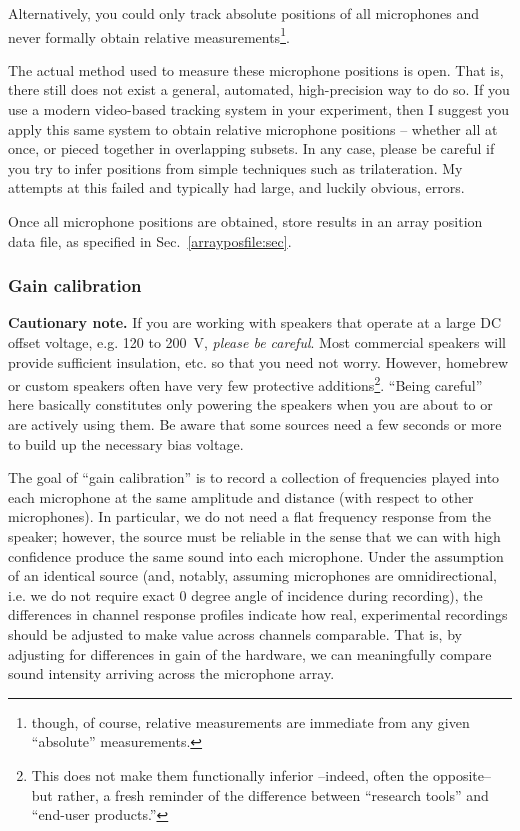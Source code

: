 \documentclass[letterpaper]{article}
\begin{document}
Alternatively, you could only track absolute positions of all
microphones and never formally obtain relative
measurements\footnote{though, of course, relative measurements are
  immediate from any given ``absolute'' measurements.}.

The actual method used to measure these microphone positions is
open. That is, there still does not exist a general, automated,
high-precision way to do so. If you use a modern video-based tracking
system in your experiment, then I suggest you apply this same system
to obtain relative microphone positions -- whether all at once, or
pieced together in overlapping subsets. In any case, please be careful
if you try to infer positions from simple techniques such as
trilateration. My attempts at this failed and typically had large, and
luckily obvious, errors.

Once all microphone positions are obtained, store results in an array
position data file, as specified in Sec.~\ref{arrayposfile:sec}.


\subsubsection{Gain calibration}

\textbf{Cautionary note.} If you are working with speakers that
operate at a large DC offset voltage, e.g. 120 to 200~V,
\textit{please be careful}. Most commercial speakers will provide
sufficient insulation, etc. so that you need not worry. However,
homebrew or custom speakers often have very few protective
additions\footnote{This does not make them functionally inferior
  --indeed, often the opposite-- but rather, a fresh reminder of the
  difference between ``research tools'' and ``end-user
  products.''}. ``Being careful'' here basically constitutes only
powering the speakers when you are about to or are actively using
them. Be aware that some sources need a few seconds or more to build up
the necessary bias voltage.

The goal of ``gain calibration'' is to record a collection of
frequencies played into each microphone at the same amplitude and
distance (with respect to other microphones). In particular, we do not
need a flat frequency response from the speaker; however, the source
must be reliable in the sense that we can with high confidence produce
the same sound into each microphone. Under the assumption of an
identical source (and, notably, assuming microphones are
omnidirectional, i.e. we do not require exact 0 degree angle of
incidence during recording), the differences in channel response
profiles indicate how real, experimental recordings should be adjusted
to make value across channels comparable. That is, by adjusting for
differences in gain of the hardware, we can meaningfully compare sound
intensity arriving across the microphone array.
\end{document}
